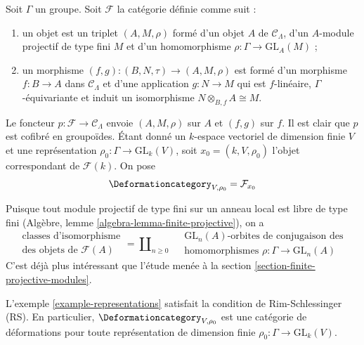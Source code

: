 \begin{example}
\label{example-representations}
Soit $\Gamma$ un groupe.
Soit $\mathcal{F}$ la catégorie définie comme suit :
\begin{enumerate}
\item un objet est un triplet $(A, M, \rho)$ formé d'un
objet $A$ de $\mathcal{C}_\Lambda$, d'un $A$-module projectif de type fini $M$
et d'un homomorphisme $\rho : \Gamma \to \text{GL}_A(M)$ ;
\item un morphisme $(f, g) : (B, N, \tau) \to (A, M, \rho)$ est formé d'un
morphisme $f : B \to A$ dans $\mathcal{C}_\Lambda$ et
d'une application $g : N \to M$ qui est $f$-linéaire, $\Gamma$-équivariante
et induit un isomorphisme $N \otimes_{B, f} A \cong M$.
\end{enumerate}
Le foncteur $p : \mathcal{F} \to \mathcal{C}_\Lambda$ envoie $(A, M, \rho)$
sur $A$ et $(f, g)$ sur $f$. Il est clair que $p$ est cofibré en groupoïdes.
Étant donné un $k$-espace vectoriel de dimension finie $V$ et une représentation
$\rho_0 : \Gamma \to \text{GL}_k(V)$,
soit $x_0 = (k, V, \rho_0)$ l'objet correspondant de $\mathcal{F}(k)$.
On pose
$$
\Deformationcategory_{V, \rho_0} = \mathcal{F}_{x_0}
$$
\end{example}

\noindent
Puisque tout module projectif de type fini sur un anneau local est libre
de type fini (Algèbre, lemme \ref{algebra-lemma-finite-projective}),
on a
$$
\begin{matrix}
\text{classes d'isomorphisme} \\
\text{des objets de }\mathcal{F}(A)
\end{matrix}
=
\coprod\nolimits_{n \geq 0}\quad
\begin{matrix}
\text{GL}_n(A)\text{-orbites de conjugaison des}\\
\text{homomorphismes }\rho : \Gamma \to \text{GL}_n(A)
\end{matrix}
$$
C'est déjà plus intéressant que l'étude menée à la
section \ref{section-finite-projective-modules}.

\begin{lemma}
\label{lemma-representations-RS}
L'exemple \ref{example-representations}
satisfait la condition de Rim-Schlessinger (RS).
En particulier, $\Deformationcategory_{V, \rho_0}$ est une catégorie de déformations
pour toute représentation de dimension finie
$\rho_0 : \Gamma \to \text{GL}_k(V)$.
\end{lemma}

